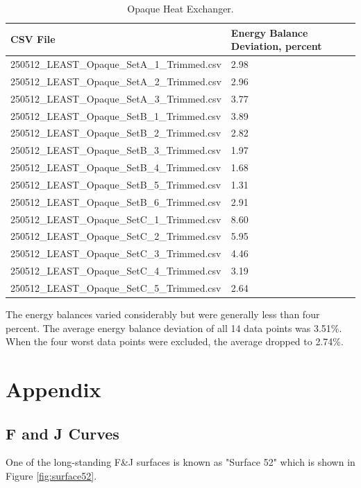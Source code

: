 \documentclass[12pt]{article}
\begin{document}
\begin{table}[h]
	\centering
	\caption{Opaque Heat Exchanger.}
	\label{tab:results2}
	\begin{tabular}{|l|l|}
		\hline
		\textbf{CSV File} & \textbf{Energy Balance Deviation, percent} \\
		\hline
			250512\_LEAST\_Opaque\_SetA\_1\_Trimmed.csv & 2.98 \\
			250512\_LEAST\_Opaque\_SetA\_2\_Trimmed.csv & 2.96 \\
			250512\_LEAST\_Opaque\_SetA\_3\_Trimmed.csv & 3.77 \\
			250512\_LEAST\_Opaque\_SetB\_1\_Trimmed.csv & 3.89 \\
			250512\_LEAST\_Opaque\_SetB\_2\_Trimmed.csv & 2.82 \\
			250512\_LEAST\_Opaque\_SetB\_3\_Trimmed.csv & 1.97 \\
			250512\_LEAST\_Opaque\_SetB\_4\_Trimmed.csv & 1.68 \\
			250512\_LEAST\_Opaque\_SetB\_5\_Trimmed.csv & 1.31 \\
			250512\_LEAST\_Opaque\_SetB\_6\_Trimmed.csv & 2.91 \\
			250512\_LEAST\_Opaque\_SetC\_1\_Trimmed.csv & 8.60 \\
			250512\_LEAST\_Opaque\_SetC\_2\_Trimmed.csv & 5.95 \\
			250512\_LEAST\_Opaque\_SetC\_3\_Trimmed.csv & 4.46 \\
			250512\_LEAST\_Opaque\_SetC\_4\_Trimmed.csv & 3.19 \\
			250512\_LEAST\_Opaque\_SetC\_5\_Trimmed.csv & 2.64 \\		
		\hline
	\end{tabular}
\end{table}
The energy balances varied considerably but were generally less than four percent. The average energy balance deviation of all 14 data points was 3.51\%. When the four worst data points were excluded, the average dropped to 2.74\%.

\newpage
\section{Appendix}
\subsection{F and J Curves}
One of the long-standing F\&J surfaces is known as "Surface 52" which is shown in Figure \ref{fig:surface52}.
\end{document}
